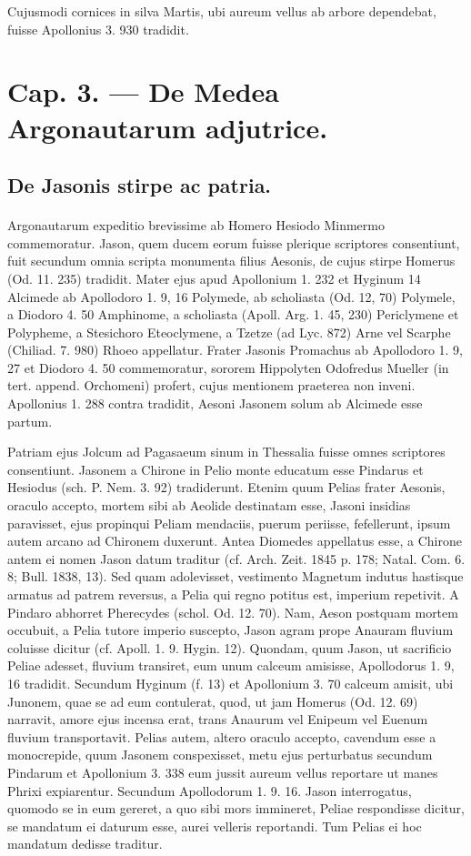 \documentclass[a4paper, 11pt, oneside, polutonikogreek, german]{article}
\begin{document}
Cujusmodi cornices in silva Martis, ubi aureum vellus ab arbore dependebat, fuisse Apollonius 3. 930 tradidit.
\clearpage
\section{Cap. 3. --- De Medea Argonautarum adjutrice.}
\subsection{De Jasonis stirpe ac patria.}
\paragraph{}
Argonautarum expeditio brevissime ab Homero Hesiodo Minmermo commemoratur. Jason, quem ducem eorum fuisse plerique scriptores consentiunt, fuit secundum omnia scripta monumenta filius Aesonis, de cujus stirpe Homerus (Od. 11. 235) tradidit. Mater ejus apud Apollonium 1. 232 et Hyginum 14 Alcimede ab Apollodoro 1. 9, 16 Polymede, ab scholiasta (Od. 12, 70) Polymele, a Diodoro 4. 50 Amphinome, a scholiasta (Apoll. Arg. 1. 45, 230) Periclymene et Polypheme, a Stesichoro Eteoclymene, a Tzetze (ad Lyc. 872) Arne vel Scarphe (Chiliad. 7. 980) Rhoeo appellatur. Frater Jasonis Promachus ab Apollodoro 1. 9, 27 et Diodoro 4. 50 commemoratur, sororem Hippolyten Odofredus Mueller (in tert. append. Orchomeni) profert, cujus mentionem praeterea non inveni. Apollonius 1. 288 contra tradidit, Aesoni Jasonem solum ab Alcimede esse partum.

Patriam ejus Jolcum ad Pagasaeum sinum in Thessalia fuisse omnes scriptores consentiunt. Jasonem a Chirone in Pelio monte educatum esse Pindarus et Hesiodus (sch. P. Nem. 3. 92) tradiderunt. Etenim quum Pelias frater Aesonis, oraculo accepto, mortem sibi ab Aeolide destinatam esse, Jasoni insidias paravisset, ejus propinqui Peliam mendaciis, puerum periisse, fefellerunt, ipsum autem arcano ad Chironem duxerunt. Antea Diomedes appellatus esse, a Chirone antem ei nomen Jason datum traditur (cf. Arch. Zeit. 1845 p. 178; Natal. Com. 6. 8; Bull. 1838, 13). Sed quam adolevisset, vestimento Magnetum indutus hastisque armatus ad patrem reversus, a Pelia qui regno potitus est, imperium repetivit. A Pindaro abhorret Pherecydes (schol. Od. 12. 70). Nam, Aeson postquam mortem occubuit, a Pelia tutore imperio suscepto, Jason agram prope Anauram fluvium coluisse dicitur (cf. Apoll. 1. 9. Hygin. 12). Quondam, quum Jason, ut sacrificio Peliae adesset, fluvium transiret, eum unum calceum amisisse, Apollodorus 1. 9, 16 tradidit. Secundum Hyginum (f. 13) et Apollonium 3. 70 calceum amisit, ubi Junonem, quae se ad eum contulerat, quod, ut jam Homerus (Od. 12. 69) narravit, amore ejus incensa erat, trans Anaurum vel Enipeum vel Euenum fluvium transportavit. Pelias autem, altero oraculo accepto, cavendum esse a monocrepide, quum Jasonem conspexisset, metu ejus perturbatus secundum Pindarum et Apollonium 3. 338 eum jussit aureum vellus reportare ut manes Phrixi expiarentur. Secundum Apollodorum 1. 9. 16. Jason interrogatus, quomodo se in eum gereret, a quo sibi mors immineret, Peliae respondisse dicitur, se mandatum ei daturum esse, aurei velleris reportandi. Tum Pelias ei hoc mandatum dedisse traditur.
\end{document}
